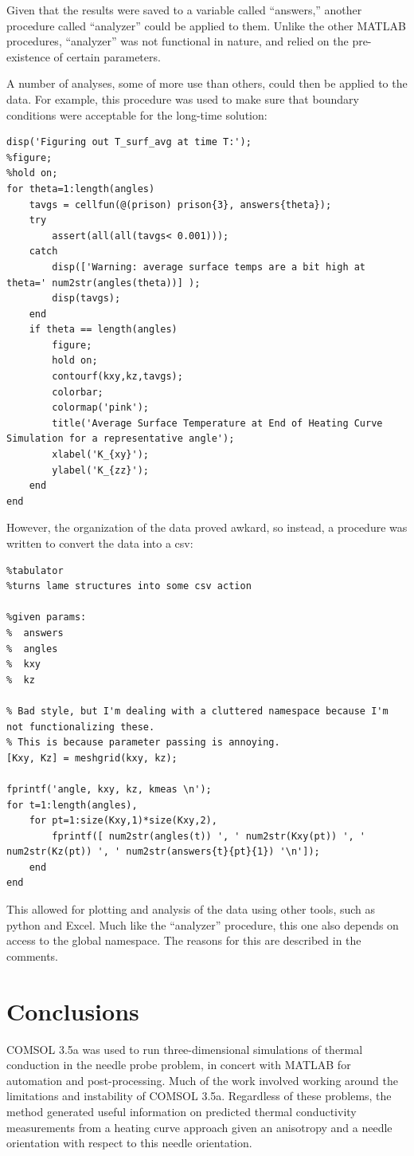 Given that the results were saved to a variable called ``answers,'' another
procedure called ``analyzer'' could be applied to them.  Unlike the other
MATLAB procedures, ``analyzer'' was not functional in nature, and relied on
the pre-existence of certain parameters.

A number of analyses, some of more use than others, could then be applied to the
data. For example, this procedure was used to make sure that boundary conditions
were acceptable for the long-time solution:


\small
\begin{verbatim}
disp('Figuring out T_surf_avg at time T:');
%figure;
%hold on;
for theta=1:length(angles)
    tavgs = cellfun(@(prison) prison{3}, answers{theta});
    try
        assert(all(all(tavgs< 0.001)));
    catch
        disp(['Warning: average surface temps are a bit high at theta=' num2str(angles(theta))] );
        disp(tavgs);
    end
    if theta == length(angles)
        figure;
        hold on;
        contourf(kxy,kz,tavgs);
        colorbar;
        colormap('pink');
        title('Average Surface Temperature at End of Heating Curve Simulation for a representative angle');
        xlabel('K_{xy}');
        ylabel('K_{zz}');
    end
end
\end{verbatim}
\normalsize

However, the organization of the data proved awkard, so instead, a procedure was
written to convert the data into a csv:

\small
\begin{verbatim}
%tabulator
%turns lame structures into some csv action

%given params:
%  answers
%  angles
%  kxy
%  kz

% Bad style, but I'm dealing with a cluttered namespace because I'm not functionalizing these.
% This is because parameter passing is annoying.
[Kxy, Kz] = meshgrid(kxy, kz);

fprintf('angle, kxy, kz, kmeas \n');
for t=1:length(angles),
    for pt=1:size(Kxy,1)*size(Kxy,2),
        fprintf([ num2str(angles(t)) ', ' num2str(Kxy(pt)) ', ' num2str(Kz(pt)) ', ' num2str(answers{t}{pt}{1}) '\n']);
    end
end
\end{verbatim}
\normalsize

This allowed for plotting and analysis of the data using other tools, such as
python and Excel. Much like the ``analyzer'' procedure, this one also depends on
access to the global namespace. The reasons for this are described in the
comments.

\section{Conclusions}

COMSOL 3.5a was used to run three-dimensional simulations of thermal conduction
in the needle probe problem, in concert with MATLAB for automation and
post-processing. Much of the work involved working around the limitations and
instability of COMSOL 3.5a. Regardless of these problems, the method generated
useful information on predicted thermal conductivity measurements from a heating
curve approach given an anisotropy and a needle orientation with respect to this
needle orientation.
